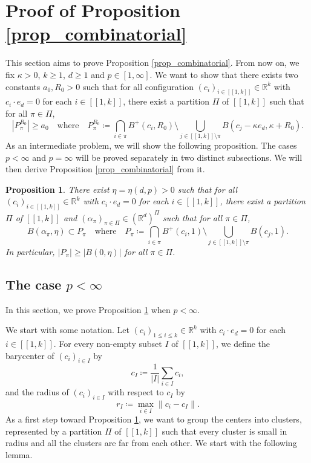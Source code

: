 \documentclass[a4paper, 11pt]{article}
\theoremstyle{plain}
\newtheorem{Proposition}[Theorem]{Proposition}
\theoremstyle{definition}
\newcommand{\R}{\mathbb{R}}
\newcommand{\range}[2]{[\![#1,#2]\!]}
\numberwithin{equation}{section}
\begin{document}
\section{Proof of Proposition \ref{prop_combinatorial}}

\label{section_balls}


This section aims to prove Proposition \ref{prop_combinatorial}. From now on, we fix $\kappa>0$, $k\geq 1$, $d\geq 1$ and $p\in[1,\infty]$. We want to show that there exists two constants $a_0, R_0>0$ such that for all configuration $(c_i)_{i\in\range{1}{k}}\in\R^k$ with $c_i\cdot e_d=0$ for each $i\in\range{1}{k}$, there exist a partition $\Pi$ of $\range{1}{k}$ such that for all $\pi\in\Pi$,
    \[|P_\pi^{R_0}|\geq a_0\quad\text{where}\quad P_\pi^{R_0}\coloneqq\bigcap_{i\in\pi} B^+(c_i, R_0)\setminus\bigcup_{j\in\range{1}{k}\setminus\pi} B(c_j-\kappa e_d, \kappa+R_0).\]
As an intermediate problem, we will show the following proposition. The cases $p<\infty$ and $p=\infty$ will be proved separately in two distinct subsections. We will then derive Proposition \ref{prop_combinatorial} from it.


\begin{Proposition}
    \label{prop_ball}
    There exist $\eta=\eta(d, p)>0$ such that for all $(c_i)_{i\in\range{1}{k}}\in\R^k$ with $c_i\cdot e_d=0$ for each $i\in\range{1}{k}$, there exist a partition $\Pi$ of $\range{1}{k}$ and $(\alpha_\pi)_{\pi\in\Pi}\in(\R^d)^\Pi$ such that for all $\pi\in\Pi$,
        \[B(\alpha_\pi,\eta)\subset P_\pi\quad\text{where}\quad P_\pi\coloneqq\bigcap_{i\in\pi}B^+(c_i, 1)\setminus\bigcup_{j\in\range{1}{k}\setminus\pi}B(c_j, 1).\]
    In particular, $|P_\pi|\geq|B(0,\eta)|$ for all $\pi\in\Pi$.
\end{Proposition}


\subsection{The case $p<\infty$}


In this section, we prove Proposition \ref{prop_ball} when $p<\infty$.

We start with some notation. Let $(c_i)_{1\leq i\leq k}\in\R^k$ with $c_i\cdot e_d=0$ for each $i\in\range{1}{k}$. For every non-empty subset $I$ of $\range{1}{k}$, we define the barycenter of $(c_i)_{i\in I}$ by
    \[c_I\coloneqq\frac{1}{|I|}\sum_{i\in I}c_i,\]
and the radius of $(c_i)_{i\in I}$ with respect to $c_I$ by
    \[r_I\coloneqq\max_{i\in I}\|c_i-c_I\|.\]
As a first step toward Proposition \ref{prop_ball}, we want to group the centers into clusters, represented by a partition $\Pi$ of $\range{1}{k}$ such that every cluster is small in radius and all the clusters are far from each other. We start with the following lemma.
\end{document}
